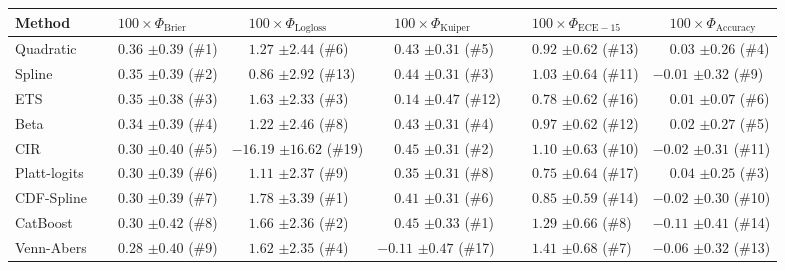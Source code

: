 \begin{tabular}{llllll}
\toprule
Method & $\phantom{-} 100 \times \Phi_\mathrm{Brier}$ & $\phantom{-} 100 \times \Phi_\mathrm{Logloss}$ & $\phantom{-} 100 \times \Phi_\mathrm{Kuiper}$ & $\phantom{-} 100 \times \Phi_\mathrm{ECE-15}$ & $\phantom{-} 100 \times \Phi_\mathrm{Accuracy}$ \\
\midrule
Quadratic & $\phantom{-}0.36$ {\tiny $\pm 0.39$} (\#1) & $\phantom{-}1.27$ {\tiny $\pm 2.44$} (\#6) & $\phantom{-}0.43$ {\tiny $\pm 0.31$} (\#5) & $\phantom{-}0.92$ {\tiny $\pm 0.62$} (\#13) & $\phantom{-}0.03$ {\tiny $\pm 0.26$} (\#4) \\
Spline & $\phantom{-}0.35$ {\tiny $\pm 0.39$} (\#2) & $\phantom{-}0.86$ {\tiny $\pm 2.92$} (\#13) & $\phantom{-}0.44$ {\tiny $\pm 0.31$} (\#3) & $\phantom{-}1.03$ {\tiny $\pm 0.64$} (\#11) & $-0.01$ {\tiny $\pm 0.32$} (\#9) \\
ETS & $\phantom{-}0.35$ {\tiny $\pm 0.38$} (\#3) & $\phantom{-}1.63$ {\tiny $\pm 2.33$} (\#3) & $\phantom{-}0.14$ {\tiny $\pm 0.47$} (\#12) & $\phantom{-}0.78$ {\tiny $\pm 0.62$} (\#16) & $\phantom{-}0.01$ {\tiny $\pm 0.07$} (\#6) \\
Beta & $\phantom{-}0.34$ {\tiny $\pm 0.39$} (\#4) & $\phantom{-}1.22$ {\tiny $\pm 2.46$} (\#8) & $\phantom{-}0.43$ {\tiny $\pm 0.31$} (\#4) & $\phantom{-}0.97$ {\tiny $\pm 0.62$} (\#12) & $\phantom{-}0.02$ {\tiny $\pm 0.27$} (\#5) \\
CIR & $\phantom{-}0.30$ {\tiny $\pm 0.40$} (\#5) & $-16.19$ {\tiny $\pm 16.62$} (\#19) & $\phantom{-}0.45$ {\tiny $\pm 0.31$} (\#2) & $\phantom{-}1.10$ {\tiny $\pm 0.63$} (\#10) & $-0.02$ {\tiny $\pm 0.31$} (\#11) \\
Platt-logits & $\phantom{-}0.30$ {\tiny $\pm 0.39$} (\#6) & $\phantom{-}1.11$ {\tiny $\pm 2.37$} (\#9) & $\phantom{-}0.35$ {\tiny $\pm 0.31$} (\#8) & $\phantom{-}0.75$ {\tiny $\pm 0.64$} (\#17) & $\phantom{-}0.04$ {\tiny $\pm 0.25$} (\#3) \\
CDF-Spline & $\phantom{-}0.30$ {\tiny $\pm 0.39$} (\#7) & $\phantom{-}1.78$ {\tiny $\pm 3.39$} (\#1) & $\phantom{-}0.41$ {\tiny $\pm 0.31$} (\#6) & $\phantom{-}0.85$ {\tiny $\pm 0.59$} (\#14) & $-0.02$ {\tiny $\pm 0.30$} (\#10) \\
CatBoost & $\phantom{-}0.30$ {\tiny $\pm 0.42$} (\#8) & $\phantom{-}1.66$ {\tiny $\pm 2.36$} (\#2) & $\phantom{-}0.45$ {\tiny $\pm 0.33$} (\#1) & $\phantom{-}1.29$ {\tiny $\pm 0.66$} (\#8) & $-0.11$ {\tiny $\pm 0.41$} (\#14) \\
Venn-Abers & $\phantom{-}0.28$ {\tiny $\pm 0.40$} (\#9) & $\phantom{-}1.62$ {\tiny $\pm 2.35$} (\#4) & $-0.11$ {\tiny $\pm 0.47$} (\#17) & $\phantom{-}1.41$ {\tiny $\pm 0.68$} (\#7) & $-0.06$ {\tiny $\pm 0.32$} (\#13) \\

\end{tabular}
